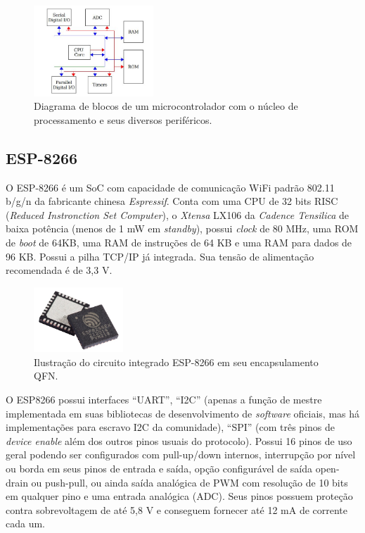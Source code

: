 \begin{figure}[ht]
    \begin{center}
    \includegraphics[width=0.4\textwidth]{figuras/micro.JPG}
    \end{center}
    \caption[Diagrama de blocos de um microcontrolador.]{Diagrama de blocos de um microcontrolador com o núcleo de processamento e seus diversos periféricos.}
    \label{micro}
\end{figure}

\subsection{ESP-8266}

O ESP-8266 \cite{esp} é um \acf{SoC} com capacidade de comunicação \ac{WiFi} padrão 802.11 b/g/n da fabricante chinesa \textit{Espressif}. Conta com uma CPU de 32 bits RISC (\textit{Reduced Instronction Set Computer}), o \textit{Xtensa} LX106 da \textit{Cadence Tensilica} de baixa potência (menos de 1 mW em \textit{standby}), possui \textit{clock} de 80 MHz, uma ROM de \textit{boot} de 64KB, uma RAM de instruções de 64 KB e uma RAM para dados de 96 KB. Possui a pilha TCP/IP já integrada. Sua tensão de alimentação recomendada é de 3,3 V.

\begin{figure}[ht]
    \begin{center}
    \includegraphics[width=0.3\textwidth]{figuras/esp8266.jpg}
    \end{center}
    \caption[ESP-8266 em seu encapsulamento QFN.]{Ilustração do circuito integrado ESP-8266 em seu encapsulamento QFN.}
    \label{esp8266}
\end{figure}

O ESP8266 possui interfaces ``UART'', ``I2C'' (apenas a função de mestre implementada em suas bibliotecas de desenvolvimento de \textit{software} oficiais, mas há implementações para escravo I2C da comunidade), ``SPI'' (com três pinos de \textit{device enable} além dos outros pinos usuais do protocolo). Possui 16 pinos de uso geral podendo ser configurados com pull-up/down internos, interrupção por nível ou borda em seus pinos de entrada e saída, opção configurável de saída open-drain ou push-pull, ou ainda saída analógica de PWM com resolução de 10 bits em qualquer pino e uma entrada analógica (ADC). Seus pinos possuem proteção contra sobrevoltagem de até 5,8 V e conseguem fornecer até 12 mA de corrente cada um.

